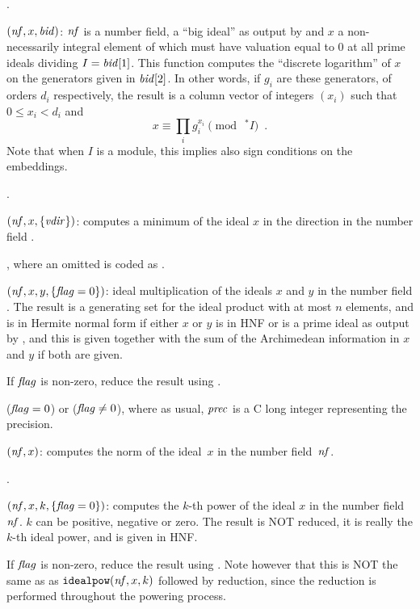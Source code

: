 .

$(\hbox{\it nf\/},x,\hbox{\it bid\/})$: $\hbox{\it nf\/}$ is a number field,
 a ``big ideal'' as output by  and $x$ a
non-necessarily integral element of  which must have valuation
equal to 0 at all prime ideals dividing $I=\hbox{\it bid\/}[1]$. This function
computes the ``discrete logarithm'' of $x$ on the generators given in
$\hbox{\it bid\/}[2]$. In other words, if $g_i$ are these generators, of orders
$d_i$ respectively, the result is a column vector of integers $(x_i)$ such
that $0\le x_i<d_i$ and
$$x\equiv\prod_ig_i^{x_i}\pmod{\ ^*I}\enspace.$$
Note that when $I$ is a module, this implies also sign conditions on the
embeddings.

.

$(\hbox{\it nf\/},x,\{\hbox{\it vdir\/}\})$: computes a minimum of
the ideal $x$ in the direction  in the number field .

, where an omitted
 is coded as .

$(\hbox{\it nf\/},x,y,\{\hbox{\it f\kern0pt lag\/}=0\})$: ideal multiplication of the
ideals $x$ and $y$ in the number field . The result is a generating
set for the ideal product with at most $n$ elements, and is in Hermite normal
form if either $x$ or $y$ is in HNF or is a prime ideal as output by
, and this is given together with the sum of the
Archimedean information in $x$ and $y$ if both are given.

If $\hbox{\it f\kern0pt lag\/}$ is non-zero, reduce the result using .

 ($\hbox{\it f\kern0pt lag\/}=0$) or
 ($\hbox{\it f\kern0pt lag\/}\neq0$), where as usual,
$\hbox{\it prec\/}$ is a C long integer representing the precision.

$(\hbox{\it nf\/},x)$: computes the norm of the ideal~$x$
in the number field~$\hbox{\it nf\/}$.

.

$(\hbox{\it nf\/},x,k,\{\hbox{\it f\kern0pt lag\/}=0\})$: computes the $k$-th power of
the ideal $x$ in the number field $\hbox{\it nf\/}$. $k$ can be positive, negative
or zero. The result is NOT reduced, it is really the $k$-th ideal power, and
is given in HNF.

If $\hbox{\it f\kern0pt lag\/}$ is non-zero, reduce the result using . Note however
that this is NOT the same as as ${\tt idealpow}(\hbox{\it nf\/},x,k)$ followed by
reduction, since the reduction is performed throughout the powering process.

